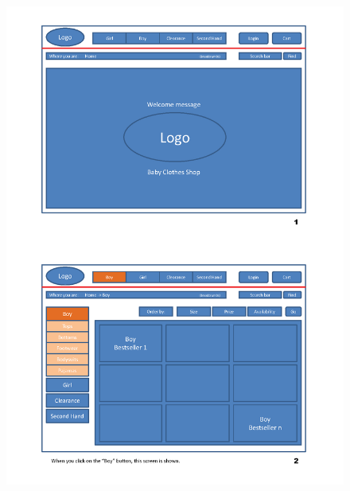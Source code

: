 \begin{figure}[H]
\begin{center}
\includegraphics[scale=0.77]{Prototype/HCI_Prototype_2_1_1.png}
\end{center}
\end{figure}
\newpage


\newpage

